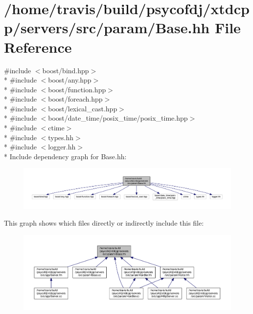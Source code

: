 \hypertarget{Base_8hh}{\section{/home/travis/build/psycofdj/xtdcpp/servers/src/param/\-Base.hh File Reference}
\label{Base_8hh}
}
{\ttfamily \#include $<$boost/bind.\-hpp$>$}\\*
{\ttfamily \#include $<$boost/any.\-hpp$>$}\\*
{\ttfamily \#include $<$boost/function.\-hpp$>$}\\*
{\ttfamily \#include $<$boost/foreach.\-hpp$>$}\\*
{\ttfamily \#include $<$boost/lexical\-\_\-cast.\-hpp$>$}\\*
{\ttfamily \#include $<$boost/date\-\_\-time/posix\-\_\-time/posix\-\_\-time.\-hpp$>$}\\*
{\ttfamily \#include $<$ctime$>$}\\*
{\ttfamily \#include $<$types.\-hh$>$}\\*
{\ttfamily \#include $<$logger.\-hh$>$}\\*
Include dependency graph for Base.\-hh\-:
\nopagebreak
\begin{figure}[H]
\begin{center}
\leavevmode
\includegraphics[width=350pt]{Base_8hh__incl}
\end{center}
\end{figure}
This graph shows which files directly or indirectly include this file\-:
\nopagebreak
\begin{figure}[H]
\begin{center}
\leavevmode
\includegraphics[width=350pt]{Base_8hh__dep__incl}
\end{center}
\end{figure}
